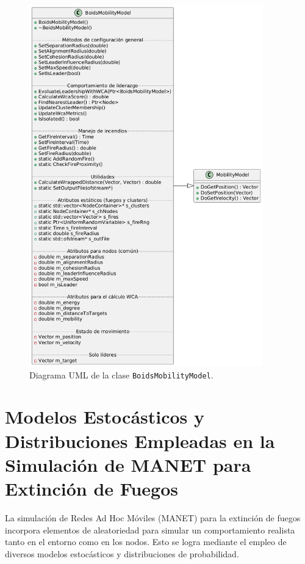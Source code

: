 \documentclass{article}
\begin{document}
\begin{figure}[H]
    \centering
    \includegraphics[width=0.9\textwidth]{BoidsMobilityModel_class.png}
    \caption{Diagrama UML de la clase \texttt{BoidsMobilityModel}.}
    \label{fig:uml-boids}
\end{figure}

\section{Modelos Estocásticos y Distribuciones Empleadas en la Simulación de MANET para Extinción de Fuegos}

La simulación de Redes Ad Hoc Móviles (MANET) para la extinción de fuegos incorpora elementos de aleatoriedad para simular un comportamiento realista tanto en el entorno como en los nodos. Esto se logra mediante el empleo de diversos modelos estocásticos y distribuciones de probabilidad.
\end{document}
